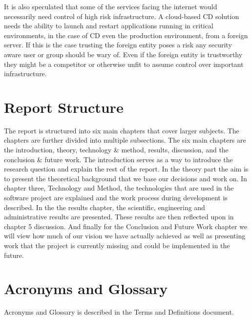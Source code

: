 It is also speculated that some of the services facing the internet would necessarily need control of high risk infrastructure. A cloud-based CD solution needs the ability to launch and restart applications running in critical environments, in the case of CD even the production environment, from a foreign server. If this is the case trusting the foreign entity poses a risk any security aware user or group should be wary of. Even if the foreign entity is trustworthy they might be a competitor or otherwise unfit to assume control over important infrastructure.

\section{Report Structure}
The report is structured into six main chapters that cover larger subjects. The chapters are further divided into multiple subsections. The six main chapters are the introduction, theory, technology \& method, results, discussion, and the conclusion \& future work. The introduction serves as a way to introduce the research question and explain the rest of the report. In the theory part the aim is to present the theoretical background that we base our decisions and work on. In chapter three, Technology and Method, the technologies that are used in the software project are explained and the work process during development is described. In the the results chapter, the scientific, engineering and administrative results are presented. These results are then reflected upon in chapter 5 discussion. And finally for the Conclusion and Future Work chapter we will view how much of our vision we have actually achieved as well as presenting work that the project is currently missing and could be implemented in the future.

\section{Acronyms and Glossary}
Acronyms and Glossary is described in the Terms and Definitions document.


  